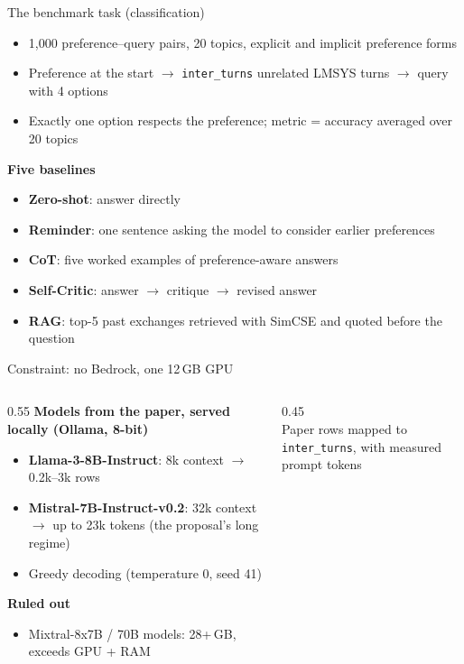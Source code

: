 \documentclass[aspectratio=169,11pt]{beamer}
\begin{document}
\begin{frame}{The benchmark task (classification)}
\begin{itemize}
  \item 1{,}000 preference--query pairs, 20 topics, explicit and implicit preference forms
  \item Preference at the start $\rightarrow$ \texttt{inter\_turns} unrelated LMSYS turns $\rightarrow$ query with 4 options
  \item Exactly one option respects the preference; metric = accuracy averaged over 20 topics
\end{itemize}
\vspace{4pt}
\textbf{Five baselines}
\begin{itemize}
  \item \textbf{Zero-shot}: answer directly
  \item \textbf{Reminder}: one sentence asking the model to consider earlier preferences
  \item \textbf{CoT}: five worked examples of preference-aware answers
  \item \textbf{Self-Critic}: answer $\rightarrow$ critique $\rightarrow$ revised answer
  \item \textbf{RAG}: top-5 past exchanges retrieved with SimCSE and quoted before the question
\end{itemize}
\end{frame}

\begin{frame}{Constraint: no Bedrock, one 12\,GB GPU}
\begin{columns}[T]
\begin{column}{0.55\textwidth}
\textbf{Models from the paper, served locally (Ollama, 8-bit)}
\begin{itemize}
  \item \textbf{Llama-3-8B-Instruct}: 8k context $\rightarrow$ 0.2k--3k rows
  \item \textbf{Mistral-7B-Instruct-v0.2}: 32k context $\rightarrow$ up to 23k tokens (the proposal's long regime)
  \item Greedy decoding (temperature 0, seed 41)
\end{itemize}
\textbf{Ruled out}
\begin{itemize}
  \item Mixtral-8x7B / 70B models: 28+\,GB, exceeds GPU + RAM
\end{itemize}
\end{column}
\begin{column}{0.45\textwidth}
\centering\scriptsize
\resizebox{\linewidth}{!}{}\\[4pt]
{\footnotesize Paper rows mapped to \texttt{inter\_turns}, with measured prompt tokens}
\end{column}
\end{columns}
\end{frame}
\end{document}
